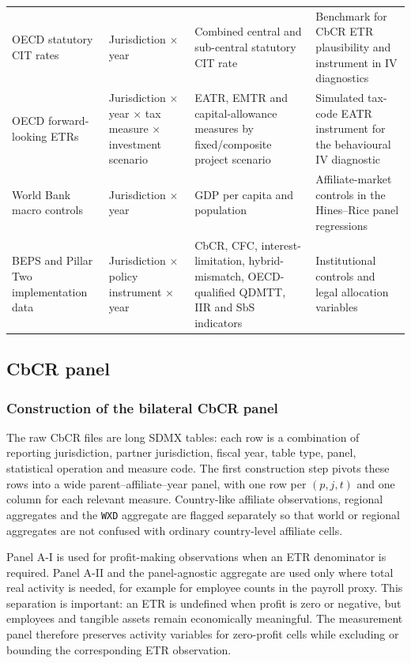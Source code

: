 \documentclass[11pt,a4paper]{article}
\newcommand{\code}[1]{\texttt{#1}}
\begin{document}
\begin{table}[H]
\begin{tabular}{@{}L{2.5cm}L{2.8cm}L{2.8cm}>{\raggedright\arraybackslash}p{5.8cm}@{}}
OECD statutory CIT rates & Jurisdiction $\times$ year & Combined central and sub-central statutory CIT rate & Benchmark for CbCR ETR plausibility and instrument in IV diagnostics \\
OECD forward-looking ETRs & Jurisdiction $\times$ year $\times$ tax measure $\times$ investment scenario & EATR, EMTR and capital-allowance measures by fixed/composite project scenario & Simulated tax-code EATR instrument for the behavioural IV diagnostic \\
World Bank macro controls & Jurisdiction $\times$ year & GDP per capita and population & Affiliate-market controls in the Hines--Rice panel regressions \\
BEPS and Pillar Two implementation data & Jurisdiction $\times$ policy instrument $\times$ year & CbCR, CFC, interest-limitation, hybrid-mismatch, OECD-qualified QDMTT, IIR and SbS indicators & Institutional controls and legal allocation variables \\
\bottomrule
\end{tabular}
\end{table}

\subsection{CbCR panel}\label{app:CbCR}

\subsubsection{Construction of the bilateral CbCR panel}\label{sec:bilateral_panel}

The raw CbCR files are long SDMX tables: each row is a combination of reporting jurisdiction, partner jurisdiction, fiscal year, table type, panel, statistical operation and measure code. The first construction step pivots these rows into a wide parent--affiliate--year panel, with one row per $(p,j,t)$ and one column for each relevant measure. Country-like affiliate observations, regional aggregates and the \code{WXD} aggregate are flagged separately so that world or regional aggregates are not confused with ordinary country-level affiliate cells.

Panel A-I is used for profit-making observations when an ETR denominator is required. Panel A-II and the panel-agnostic aggregate are used only where total real activity is needed, for example for employee counts in the payroll proxy. This separation is important: an ETR is undefined when profit is zero or negative, but employees and tangible assets remain economically meaningful. The measurement panel therefore preserves activity variables for zero-profit cells while excluding or bounding the corresponding ETR observation. 
\end{document}
